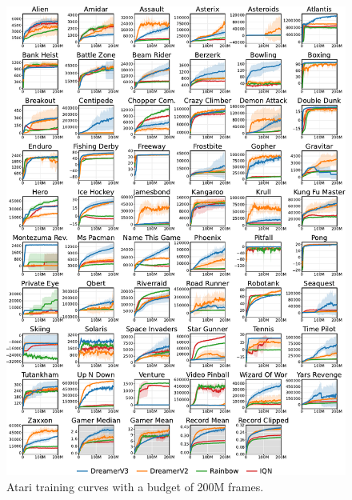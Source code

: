 \begin{figure}[h!]
\centering
\includegraphics[width=\linewidth]{atari/atari}
\caption{Atari training curves with a budget of 200M frames.}
\label{fig:atari}
\end{figure}
